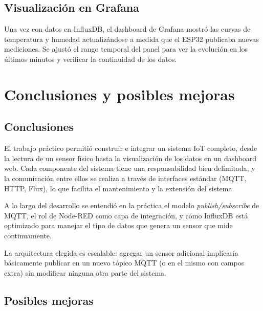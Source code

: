 \documentclass[12pt, a4paper]{article}
\begin{document}
\subsection{Visualización en Grafana}

Una vez con datos en InfluxDB, el dashboard de Grafana mostró las curvas de
temperatura y humedad actualizándose a medida que el ESP32 publicaba nuevas
mediciones. Se ajustó el rango temporal del panel para ver la evolución en los
últimos minutos y verificar la continuidad de los datos.

\section{Conclusiones y posibles mejoras}

\subsection{Conclusiones}

El trabajo práctico permitió construir e integrar un sistema IoT completo, desde la
lectura de un sensor físico hasta la visualización de los datos en un dashboard web.
Cada componente del sistema tiene una responsabilidad bien delimitada, y la
comunicación entre ellos se realiza a través de interfaces estándar (MQTT, HTTP,
Flux), lo que facilita el mantenimiento y la extensión del sistema.

A lo largo del desarrollo se entendió en la práctica el modelo
\textit{publish/subscribe} de MQTT, el rol de Node-RED como capa de integración, y
cómo InfluxDB está optimizado para manejar el tipo de datos que genera un sensor
que mide continuamente.

La arquitectura elegida es escalable: agregar un sensor adicional implicaría
básicamente publicar en un nuevo tópico MQTT (o en el mismo con campos extra) sin
modificar ninguna otra parte del sistema.

\subsection{Posibles mejoras}
\end{document}
